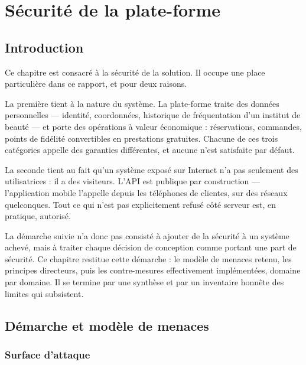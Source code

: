 \chapter{Sécurité de la plate-forme}

\section*{Introduction}

Ce chapitre est consacré à la sécurité de la solution. Il occupe une place
particulière dans ce rapport, et pour deux raisons.

La première tient à la nature du système. La plate-forme traite des données
personnelles --- identité, coordonnées, historique de fréquentation d'un
institut de beauté --- et porte des opérations à valeur économique :
réservations, commandes, points de fidélité convertibles en prestations
gratuites. Chacune de ces trois catégories appelle des garanties différentes,
et aucune n'est satisfaite par défaut.

La seconde tient au fait qu'un système exposé sur Internet n'a pas seulement
des utilisatrices : il a des visiteurs. L'API est publique par construction ---
l'application mobile l'appelle depuis les téléphones de clientes, sur des
réseaux quelconques. Tout ce qui n'est pas explicitement refusé côté serveur
est, en pratique, autorisé.

La démarche suivie n'a donc pas consisté à ajouter de la sécurité à un système
achevé, mais à traiter chaque décision de conception comme portant une part de
sécurité. Ce chapitre restitue cette démarche : le modèle de menaces retenu,
les principes directeurs, puis les contre-mesures effectivement implémentées,
domaine par domaine. Il se termine par une synthèse et par un inventaire
honnête des limites qui subsistent.

\section{Démarche et modèle de menaces}

\subsection{Surface d'attaque}

